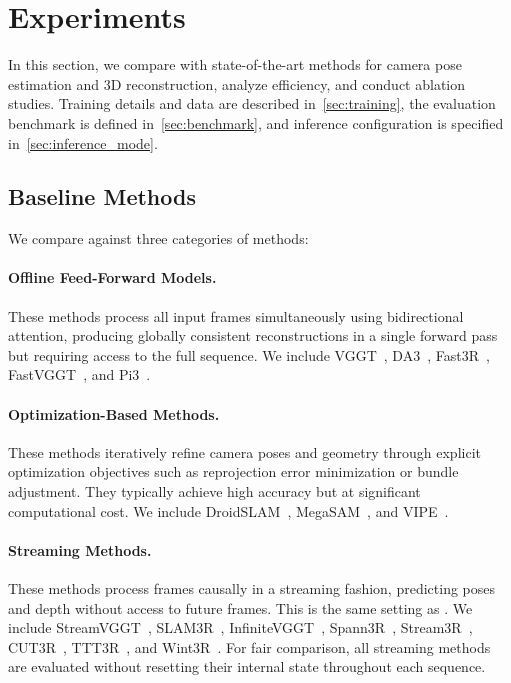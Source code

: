 \section{Experiments}

In this section, we compare \method with state-of-the-art methods for camera pose estimation and 3D reconstruction, analyze efficiency, and conduct ablation studies.
Training details and data are described in~\cref{sec:training},
the evaluation benchmark is defined in~\cref{sec:benchmark},
and inference configuration is specified in~\cref{sec:inference_mode}.


\subsection{Baseline Methods}

We compare \method against three categories of methods:

\paragraph{Offline Feed-Forward Models.}
These methods process all input frames simultaneously using
bidirectional attention, producing globally consistent reconstructions
in a single forward pass but requiring access to the full sequence.
We include VGGT~\cite{wang2025vggt},
DA3~\cite{depthanything3},
Fast3R~\cite{yang2025fast3r},
FastVGGT~\cite{shen2025fastvggt},
and Pi3~\cite{wang2025pi}.

\paragraph{Optimization-Based Methods.}
These methods iteratively refine camera poses and geometry through
explicit optimization objectives such as reprojection error
minimization or bundle adjustment.
They typically achieve high accuracy but at significant computational
cost.
We include DroidSLAM~\cite{teed2021droid},
MegaSAM~\cite{li2025megasam},
and VIPE~\cite{huang2025vipe}.

\paragraph{Streaming Methods.}
These methods process frames causally in a streaming fashion,
predicting poses and depth without access to future frames.
This is the same setting as \method.
We include StreamVGGT~\cite{streamVGGT},
SLAM3R~\cite{liu2025slam3r},
InfiniteVGGT~\cite{yuan2026infinitevggt},
Spann3R~\cite{wang20253d},
Stream3R~\cite{stream3r2025},
CUT3R~\cite{cut3r},
TTT3R~\cite{chen2025ttt3r},
and Wint3R~\cite{li2025wint3r}.
For fair comparison, all streaming methods are evaluated without
resetting their internal state throughout each sequence.




